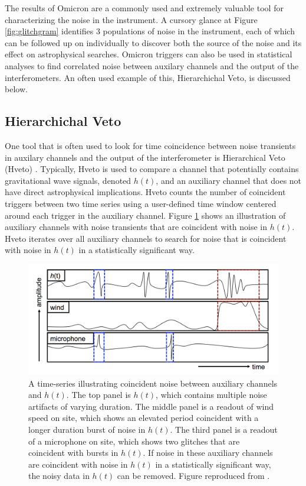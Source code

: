 The results of Omicron are a commonly used and extremely valuable tool 
for characterizing the noise in the instrument. A cursory glance at 
Figure \ref{fig:glitchgram} identifies 3 populations of noise in 
the instrument, each of which can be followed up on individually 
to discover both the source of the noise and its effect on astrophysical 
searches. Omicron triggers can also be used in statistical analyses to 
find correlated noise between auxilary channels and the output of the 
interferometers. An often used 
example of this, Hierarchichal Veto, is discussed below. 

\subsection{Hierarchichal Veto}

One tool that is often used to look 
for time coincidence between noise transients in auxilary 
channels and the output of the interferometer is Hierarchical Veto (Hveto) 
\cite{Smith:2011}. 
Typically, Hveto is used to compare a channel that potentially contains 
gravitational wave signals, denoted $h(t)$, and an auxiliary channel 
that does not have direct astrophysical implications. Hveto counts 
the number of coincident triggers between two time series using a 
user-defined time window centered around each trigger in the auxiliary 
channel. 
Figure \ref{fig:hveto-aux} shows an illustration of auxiliary channels 
with noise transients that are coincident with noise in $h(t)$. Hveto 
iterates over all auxiliary channels to search for noise that is coincident 
with noise in $h(t)$ in a statistically significant way.

\begin{figure}[ht!]
\includegraphics[width=\textwidth]{figures/detchar/hveto_example}
\caption[Example of coincident noise]{A time-series illustrating coincident noise %
         between auxiliary channels and $h(t)$. The top panel is $h(t)$, which contains %
         multiple noise artifacts of varying duration. The middle panel is a readout of %
         wind speed on site, which shows an elevated period coincident with a longer duration %
         burst of noise in $h(t)$. The third panel is a readout of a microphone on site, %
         which shows two glitches that are coincident with bursts in $h(t)$. If noise in %
         these auxiliary channels are coincident with noise in $h(t)$ in a statistically %
         significant way, the noisy data in $h(t)$ can be removed. Figure reproduced from %
         \cite{Smith:2011}.
         }
\label{fig:hveto-aux}
\end{figure}

